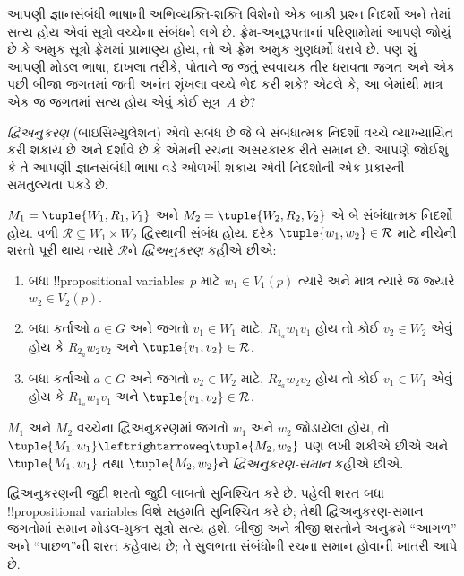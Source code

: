 \documentclass[../../../include/open-logic-section]{subfiles}
\begin{document}


આપણી જ્ઞાનસંબંધી ભાષાની અભિવ્યક્તિ-શક્તિ વિશેનો એક બાકી પ્રશ્ન
નિદર્શો અને તેમાં સત્ય હોય એવાં સૂત્રો વચ્ચેના સંબંધને લગે છે.
ફ્રેમ-અનુરૂપતાનાં પરિણામોમાં આપણે જોયું છે કે અમુક સૂત્રો
ફ્રેમમાં પ્રામાણ્ય હોય, તો એ ફ્રેમ અમુક ગુણધર્મો ધરાવે છે.
પણ શું આપણી મોડલ ભાષા, દાખલા તરીકે, પોતાને જ જતું સ્વવાચક તીર
ધરાવતા જગત અને એક પછી બીજા જગતમાં જતી અનંત શૃંખલા વચ્ચે ભેદ
કરી શકે? એટલે કે, આ બેમાંથી માત્ર એક જ જગતમાં સત્ય હોય એવું
કોઈ સૂત્ર~$A$ છે?

\emph{દ્વિઅનુકરણ} (બાઇસિમ્યુલેશન) એવો સંબંધ છે જે બે
સંબંધાત્મક નિદર્શો વચ્ચે વ્યાખ્યાયિત કરી શકાય છે અને દર્શાવે
છે કે એમની રચના અસરકારક રીતે સમાન છે. આપણે જોઈશું કે તે
આપણી જ્ઞાનસંબંધી ભાષા વડે ઓળખી શકાય એવી નિદર્શોની એક પ્રકારની
સમતુલ્યતા પકડે છે.

\begin{defn}[દ્વિઅનુકરણ]
$M_1 = \tuple{W_1, R_1, V_1}$ અને $M_2 = \tuple{W_2, R_2, V_2}$
એ બે સંબંધાત્મક નિદર્શો હોય. વળી $\mathcal{R} \subseteq W_1 \times W_2$
દ્વિસ્થાની સંબંધ હોય. દરેક $\tuple{w_1, w_2} \in \mathcal{R}$
માટે નીચેની શરતો પૂરી થાય ત્યારે $\mathcal{R}$ને
\emph{દ્વિઅનુકરણ} કહીએ છીએ:

\begin{enumerate}
  \item બધા !!{propositional variable}s~$p$ માટે
  $w_1 \in V_1(p)$ ત્યારે અને માત્ર ત્યારે જ જ્યારે $w_2 \in V_2(p)$.
  \item બધા કર્તાઓ $a \in G$ અને જગતો $v_1 \in W_1$ માટે,
  $R_{1_a} w_1 v_1$ હોય તો કોઈ $v_2 \in W_2$ એવું હોય કે
  $R_{2_a} w_2 v_2$ અને $\tuple{v_1, v_2} \in
  \mathcal{R}$.
  \item બધા કર્તાઓ $a \in G$ અને જગતો $v_2 \in W_2$ માટે,
  $R_{2_a} w_2 v_2$ હોય તો કોઈ $v_1 \in W_1$ એવું હોય કે
  $R_{1_a} w_1 v_1$ અને $\tuple{v_1, v_2} \in
  \mathcal{R}$.
\end{enumerate}

$M_1$ અને $M_2$ વચ્ચેના દ્વિઅનુકરણમાં જગતો $w_1$ અને $w_2$
જોડાયેલા હોય, તો $\tuple{M_1, w_1} \leftrightarroweq
\tuple{M_2, w_2}$ પણ લખી શકીએ છીએ અને $\tuple{M_1, w_1}$ તથા
$\tuple{M_2, w_2}$ને \emph{દ્વિઅનુકરણ-સમાન} કહીએ છીએ.
\end{defn}

દ્વિઅનુકરણની જુદી શરતો જુદી બાબતો સુનિશ્ચિત કરે છે.
પહેલી શરત બધા !!{propositional variable}s વિશે સહમતિ
સુનિશ્ચિત કરે છે; તેથી દ્વિઅનુકરણ-સમાન જગતોમાં સમાન
મોડલ-મુક્ત સૂત્રો સત્ય હશે. બીજી અને ત્રીજી શરતોને અનુક્રમે
``આગળ'' અને ``પાછળ''ની શરત કહેવાય છે; તે સુલભતા સંબંધોની
રચના સમાન હોવાની ખાતરી આપે છે.
\end{document}
